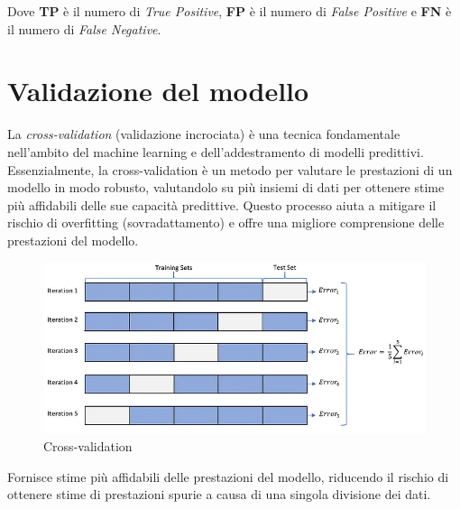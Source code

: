 Dove \textbf{TP} è il numero di \textit{True Positive}, \textbf{FP} è il numero di \textit{False Positive} e \textbf{FN} è il numero di \textit{False Negative}.

\section{Validazione del modello}

La \textit{cross-validation} (validazione incrociata) è una tecnica fondamentale nell'ambito del machine learning e dell'addestramento di modelli predittivi. Essenzialmente, la cross-validation è un metodo per valutare le prestazioni di un modello in modo robusto, valutandolo su più insiemi di dati per ottenere stime più affidabili delle sue capacità predittive. Questo processo aiuta a mitigare il rischio di overfitting (sovradattamento) e offre una migliore comprensione delle prestazioni del modello.

\begin{figure}[!ht]
	\begin{adjustbox}{width=0.7\columnwidth, center}
		\includegraphics{./images/cross_validation.png}
	\end{adjustbox}
  \caption{Cross-validation}
  \label{fig:cross_validation}
\end{figure}

Fornisce stime più affidabili delle prestazioni del modello, riducendo il rischio di ottenere stime di prestazioni spurie a causa di una singola divisione dei dati.


